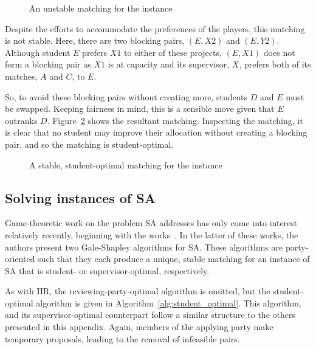 \begin{figure}[htbp]
    \centering
    \resizebox{\imgwidth}{!}{%
        
    }\caption{An unstable matching for the instance}\label{fig:sa_unstable}
\end{figure}

Despite the efforts to accommodate the preferences of the players, this matching
is not stable. Here, there are two blocking pairs, \((E, X2)\) and \((E, Y2)\).
Although student \(E\) prefers \(X1\) to either of these projects, \((E, X1)\)
does not form a blocking pair as \(X1\) is at capacity and its supervisor,
\(X\), prefers both of its matches, \(A\) and \(C\), to \(E\).

So, to avoid these blocking pairs without creating more, students \(D\) and
\(E\) must be swapped. Keeping fairness in mind, this is a sensible move given
that \(E\) outranks \(D\). Figure~\ref{fig:sa_stable} shows the resultant
matching. Inspecting the matching, it is clear that no student may improve their
allocation without creating a blocking pair, and so the matching is
student-optimal.

\begin{figure}
    \centering
    \resizebox{\imgwidth}{!}{%
        
    }\caption{%
        A stable, student-optimal matching for the instance
    }\label{fig:sa_stable}
\end{figure}

\subsection{Solving instances of SA}

Game-theoretic work on the problem SA addresses has only come into interest
relatively recently, beginning with the works~\cite{Abraham2003,Abraham2007}. In
the latter of these works, the authors present two Gale-Shapley algorithms for
SA. These algorithms are party-oriented such that they each produce a unique,
stable matching for an instance of SA that is student- or supervisor-optimal,
respectively.

As with HR, the reviewing-party-optimal algorithm is omitted, but
the student-optimal algorithm is given in Algorithm~\ref{alg:student_optimal}.
This algorithm, and its supervisor-optimal counterpart follow a similar
structure to the others presented in this appendix. Again, members of the
applying party make temporary proposals, leading to the removal of infeasible
pairs.

